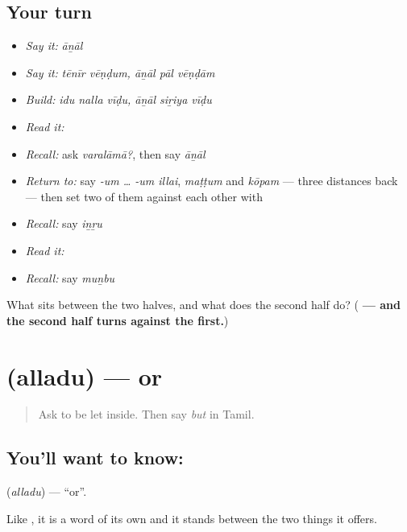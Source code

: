 \subsection*{Your turn}
\begin{itemize}
\raggedright
  \item \emph{Say it:} \emph{āṉāl}
  \item \emph{Say it:} \emph{tēnīr vēṇḍum, āṉāl pāl vēṇḍām}
  \item \emph{Build:} \emph{idu nalla vīḍu, āṉāl siṟiya vīḍu}
  \item \emph{Read it:} \textbf{}
  \item \emph{Recall:} ask \emph{varalāmā?}, then say \emph{āṉāl}
  \item \emph{Return to:} say \emph{-um … -um illai}, \emph{maṭṭum} and \emph{kōpam} — three distances back — then set two of them against each other with 
  \item \emph{Recall:} say \emph{iṉṟu}
  \item \emph{Read it:} \textbf{}
  \item \emph{Recall:} say \emph{muṉbu}
\end{itemize}

\begin{tcolorbox}[breakable,colback=teal!4,colframe=teal!35!black,title={Before you move on}]
What sits between the two halves, and what does the second half do? (\textbf{ — and the second half turns against the first.})
\end{tcolorbox}
\section[\texorpdfstring{\ta{அல்லது} (alladu)}{அல்லது (alladu)}]{ (alladu) — or}

\label{lesson:TA-C76-or}



\begin{quote}
Ask to be let inside. Then say \emph{but} in Tamil.
\end{quote}

\subsection*{You'll want to know: }
\textbf{} (\emph{alladu}) — \textquotedblleft{}or\textquotedblright{}.

Like , it is a word of its own and it stands between the two things it offers.


